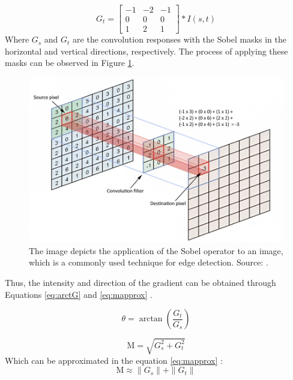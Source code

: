\begin{equation}
G_t= \begin{bmatrix}
-1 & -2 & -1 \\
0 & 0 & 0 \\
1 & 2 & 1
\end{bmatrix} * I(s, t)
\label{eq:gt}
\end{equation}
Where \(G_s\) and \(G_t\) are the convolution responses with the Sobel masks in the horizontal and vertical directions, respectively. The process of applying these masks can be observed in Figure \ref{fig: sobelApplyed}.
\begin{figure}[ht!]
\centering
\includegraphics[width=.65\linewidth]{images/Development/chap3/mask.png}
\caption{The image depicts the application of the Sobel operator to an image, which is a commonly used technique for edge detection. Source: \cite{Matthew2020}.}
\label{fig: sobelApplyed}
\end{figure}

Thus, the intensity and direction of the gradient can be obtained through Equations \eqref{eq:arctG} and \eqref{eq:mapprox} \cite{gonzalez_rafael_c_digital_2018, Zhang2020}.

\begin{equation}
    \theta = \arctan \left( \frac{{G_t}}{{G_s}} \right)
    \label{eq:arctG}
\end{equation}

\begin{equation}
    \text{{M}} = \sqrt{{G_s^2 + G_t^2}}
\end{equation}
Which can be approximated in the equation \ref{eq:mapprox} \cite{gonzalez_rafael_c_digital_2018}: 
\begin{equation}
    \text{{M}} \approx \|G_s\| + \|G_t\| 
    \label{eq:mapprox}
\end{equation}

